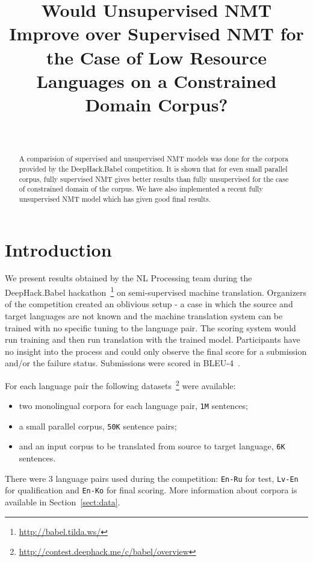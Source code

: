 \documentclass[]{article}
\begin{document}
\title{\bf Would Unsupervised NMT Improve over Supervised NMT for the Case of Low Resource Languages on a Constrained Domain Corpus?}
\author{ \hfill  {}\\
\AND
         \hfill {}
}

\maketitle
\pagestyle{empty}

\begin{abstract}
  A comparision of supervised and unsupervised NMT models was done for the corpora provided by the DeepHack.Babel competition.
  It is shown that for even small parallel corpus, fully supervised NMT gives better results than fully unsupervised for the case of constrained domain of the corpus.
  We have also implemented a recent fully unsupervised NMT model which has given good final results.
\end{abstract}

\section{Introduction}
\label{sect:intro}

We present results obtained by the NL Processing team during the DeepHack.Babel hackathon~\footnote{\url{http://babel.tilda.ws/}} on semi-supervised machine translation.
Organizers of the competition created an oblivious setup - a case in which the source and target languages are not known and the machine translation system can be trained with no specific tuning to the language pair.
The scoring system would run training and then run translation with the trained model.
Participants have no insight into the process and could only observe the final score for a submission and/or the failure status.
Submissions were scored in BLEU-4~\citep{papineni2002bleu}.

For each language pair the following datasets~\footnote{\url{http://contest.deephack.me/c/babel/overview}} were available:
\begin{itemize}
  \item two monolingual corpora for each language pair, {\tt 1M} sentences;
  \item a small parallel corpus, {\tt 50K} sentence pairs;
  \item and an input corpus to be translated from source to target language, {\tt 6K} sentences.
\end{itemize}
There were 3 language pairs used during the competition: {\tt En-Ru} for test, {\tt Lv-En} for qualification and {\tt En-Ko} for final scoring.
More information about corpora is available in Section~\ref{sect:data}.
\end{document}
